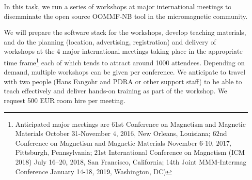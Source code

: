 \begin{workpackage}[id=dissem,wphases=18-48!.5,
  title=Dissemination,
  SARM=1,
  USORM=7,
  USHRM=8
]
\begin{wpdelivs}
\end{wpdelivs}

\begin{tasklist}
\begin{task}[title=OOMMF-NB dissemination workshops,
id=dissemination-of-oommf-nb-workshops]
  
  In this task, we run a series of workshops at major international
  meetings to disemminate the open source OOMMF-NB tool in the
  micromagnetic community.

  We will prepare the software stack for the workshops, develop teaching
  materials, and do the planning (location, advertising, registration)
  and delivery of workshops at the 4 major international meetings
  taking place in the appropriate time frame\footnote{Anticipated
    major meetings are 61st Conference
    on Magnetism and Magnetic Materials October 31-November 4, 2016,
    New Orleans, Louisiana; 62nd Conference on Magnetism and Magnetic
    Materials November 6-10, 2017, Pittsburgh, Pennsylvania; 21st
    International Conference on Magnetism (ICM 2018) July 16–20, 2018,
    San Francisco, California; 14th Joint MMM-Intermag Conference
    January 14-18, 2019, Washington, DC)} each of which tends to
  attract around 1000 attendees. Depending on demand, multiple
  workshops can be given per conference. We anticipate to travel with two
  people (Hans Fangohr and PDRA or other support staff) to be able to teach
  effectively and deliver hands-on training as part of the
  workshop. We request 500 EUR room hire per meeting.
\end{task}
\end{tasklist}


\end{workpackage}
